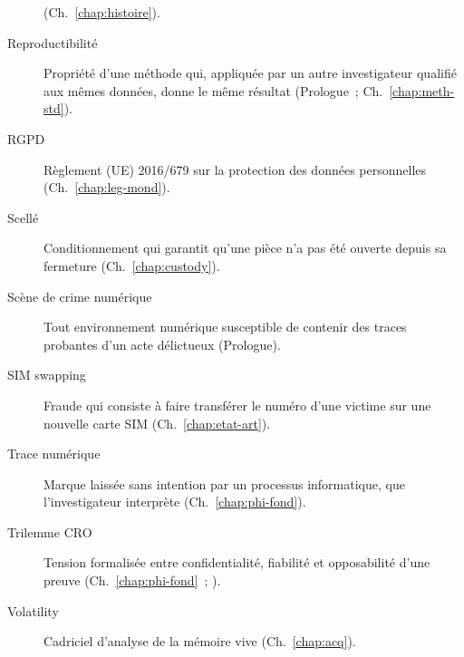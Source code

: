 \begin{description}
          (Ch.~\ref{chap:histoire}).
    \item[Reproductibilité] Propriété d'une méthode qui, appliquée par un
          autre investigateur qualifié aux mêmes données, donne le même
          résultat (Prologue~; Ch.~\ref{chap:meth-std}).
    \item[RGPD] Règlement (UE) 2016/679 sur la protection des données
          personnelles (Ch.~\ref{chap:leg-mond}).
    \item[Scellé] Conditionnement qui garantit qu'une pièce n'a pas été
          ouverte depuis sa fermeture (Ch.~\ref{chap:custody}).
    \item[Scène de crime numérique] Tout environnement numérique susceptible
          de contenir des traces probantes d'un acte délictueux (Prologue).
    \item[SIM swapping] Fraude qui consiste à faire transférer le numéro d'une
          victime sur une nouvelle carte SIM (Ch.~\ref{chap:etat-art}).
    \item[Trace numérique] Marque laissée sans intention par un processus
          informatique, que l'investigateur interprète (Ch.~\ref{chap:phi-fond}).
    \item[Trilemme CRO] Tension formalisée entre confidentialité, fiabilité et
          opposabilité d'une preuve (Ch.~\ref{chap:phi-fond}~;
          \cite{minka2025cro}).
    \item[Volatility] Cadriciel d'analyse de la mémoire vive
          (Ch.~\ref{chap:acq}).
\end{description}
